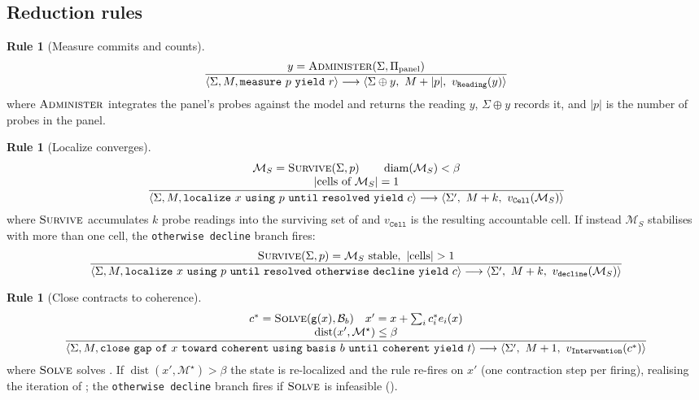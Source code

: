 \documentclass[11pt,a4paper]{article}
\theoremstyle{cfcthm}
\theoremstyle{definition}
\newtheorem{rulename}[theorem]{Rule}
\theoremstyle{remark}
\newcommand{\Man}{\mathcal{M}}          %
\newcommand{\Coh}{\Man^{\star}}         %
\newcommand{\flo}{\beta}                %
\newcommand{\Probe}{\Pi}                %
\newcommand{\gap}{\mathsf{g}}           %
\newcommand{\basis}{\mathcal{B}}        %
\newcommand{\dose}{c}                   %
\newcommand{\rec}{M}                    %
\newcommand{\abs}[1]{\lvert#1\rvert}
\newcommand{\diam}{\operatorname{diam}}
\newcommand{\dist}{\operatorname{dist}}
\newcommand{\stepto}{\longrightarrow}
\newcommand{\cf}[1]{\texttt{#1}}
\begin{document}
\subsection{Reduction rules}

\begin{rulename}[Measure commits and counts]
\label{rule:measure-step}
\[
\frac{y=\textsc{Administer}(\Sigma,\Probe_{\mathrm{panel}})}
     {\langle\Sigma,\rec,\cf{measure}\ p\ \cf{yield}\ r\rangle\stepto
      \langle\Sigma\oplus y,\ \rec+\abs{p},\ v_{\cf{Reading}}(y)\rangle}
\]
where $\textsc{Administer}$ integrates the panel's probes against the model and
returns the reading $y$, $\Sigma\oplus y$ records it, and $\abs{p}$ is the
number of probes in the panel.
\end{rulename}

\begin{rulename}[Localize converges]
\label{rule:localize-step}
\[
\frac{\begin{array}{c}
\Man_S=\textsc{Survive}(\Sigma,p)\qquad\diam(\Man_S)<\flo\\
\abs{\text{cells of }\Man_S}=1
\end{array}}
{\langle\Sigma,\rec,\cf{localize}\ x\ \cf{using}\ p\ \cf{until}\ \cf{resolved}\ \cf{yield}\ c\rangle\stepto
 \langle\Sigma',\ \rec+k,\ v_{\cf{Cell}}(\Man_S)\rangle}
\]
where $\textsc{Survive}$ accumulates $k$ probe readings into the surviving set
of  and $v_{\cf{Cell}}$ is the resulting accountable cell.
If instead $\Man_S$ stabilises with more than one cell, the
\cf{otherwise decline} branch fires:
\[
\frac{\textsc{Survive}(\Sigma,p)=\Man_S\text{ stable},\ \abs{\text{cells}}>1}
{\langle\Sigma,\rec,\cf{localize}\ x\ \cf{using}\ p\ \cf{until}\ \cf{resolved}\ \cf{otherwise}\ \cf{decline}\ \cf{yield}\ c\rangle\stepto
 \langle\Sigma',\ \rec+k,\ v_{\cf{decline}}(\Man_S)\rangle}
\]
\end{rulename}

\begin{rulename}[Close contracts to coherence]
\label{rule:close-step}
\[
\frac{\begin{array}{c}
\dose^{\ast}=\textsc{Solve}(\gap(x),\basis_b)\quad x'=x+\textstyle\sum_i \dose^{\ast}_i e_i(x)\\
\dist(x',\Coh)\le\flo
\end{array}}
{\langle\Sigma,\rec,\cf{close}\ \cf{gap}\ \cf{of}\ x\ \cf{toward}\ \cf{coherent}\ \cf{using}\ \cf{basis}\ b\ \cf{until}\ \cf{coherent}\ \cf{yield}\ t\rangle\stepto
 \langle\Sigma',\ \rec+1,\ v_{\cf{Intervention}}(\dose^{\ast})\rangle}
\]
where $\textsc{Solve}$ solves . If $\dist(x',\Coh)>\flo$ the
state is re-localized and the rule re-fires on $x'$ (one contraction step per
firing), realising the iteration of ; the
\cf{otherwise decline} branch fires if $\textsc{Solve}$ is infeasible
().
\end{rulename}
\end{document}
